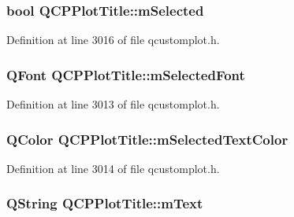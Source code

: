 \hypertarget{class_q_c_p_plot_title_afef1342a20f5ca985a20b9cfdc03d815}{
\subsubsection[{m\-Selected}]{\setlength{\rightskip}{0pt plus 5cm}bool Q\-C\-P\-Plot\-Title\-::m\-Selected\hspace{0.3cm}{\ttfamily [protected]}}}\label{class_q_c_p_plot_title_afef1342a20f5ca985a20b9cfdc03d815}


Definition at line 3016 of file qcustomplot.\-h.

\hypertarget{class_q_c_p_plot_title_a95003186c39bbab902873a8ef4cbb547}{
\subsubsection[{m\-Selected\-Font}]{\setlength{\rightskip}{0pt plus 5cm}Q\-Font Q\-C\-P\-Plot\-Title\-::m\-Selected\-Font\hspace{0.3cm}{\ttfamily [protected]}}}\label{class_q_c_p_plot_title_a95003186c39bbab902873a8ef4cbb547}


Definition at line 3013 of file qcustomplot.\-h.

\hypertarget{class_q_c_p_plot_title_a8b9760e62af92814c4effdd7ad69c5f9}{
\subsubsection[{m\-Selected\-Text\-Color}]{\setlength{\rightskip}{0pt plus 5cm}Q\-Color Q\-C\-P\-Plot\-Title\-::m\-Selected\-Text\-Color\hspace{0.3cm}{\ttfamily [protected]}}}\label{class_q_c_p_plot_title_a8b9760e62af92814c4effdd7ad69c5f9}


Definition at line 3014 of file qcustomplot.\-h.

\hypertarget{class_q_c_p_plot_title_a0d961bfac1211d59d3b0bc30d35f6379}{
\subsubsection[{m\-Text}]{\setlength{\rightskip}{0pt plus 5cm}Q\-String Q\-C\-P\-Plot\-Title\-::m\-Text\hspace{0.3cm}{\ttfamily [protected]}}}\label{class_q_c_p_plot_title_a0d961bfac1211d59d3b0bc30d35f6379}


